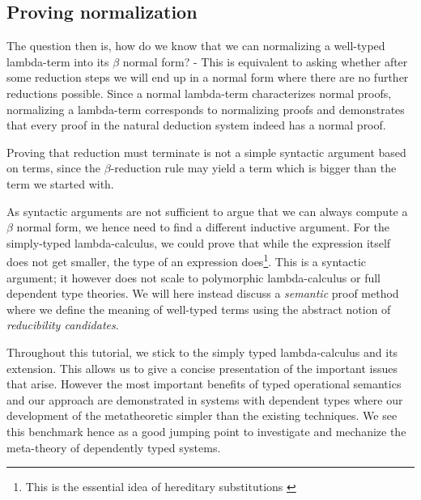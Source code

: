 \documentclass{article}
\begin{document}




\subsection*{Proving normalization}
The question then is, how do we know that we can normalizing a well-typed lambda-term into its $\beta$ normal form? - This is equivalent to asking whether after some reduction steps we will end up in a normal form where there are no further reductions possible. Since a normal lambda-term characterizes normal proofs, normalizing a lambda-term corresponds to normalizing proofs and demonstrates that every proof in the natural deduction system indeed has a normal proof. %

Proving that reduction must terminate is not a simple syntactic argument based on terms, since the $\beta$-reduction rule may yield a term which is bigger than the term we started with. %

As syntactic arguments are not sufficient to argue that we can always compute a $\beta$ normal form, we hence need to find a different inductive argument. For the simply-typed lambda-calculus, we could prove that while the expression itself does not get smaller,  the type of an expression does\footnote{This is the essential idea of hereditary substitutions \cite{Watkins02tr}}.  This is a syntactic argument; it however does not scale to polymorphic lambda-calculus or full dependent type theories. We will here instead discuss a \emph{semantic} proof method where we define the meaning of well-typed terms using the abstract notion of \emph{reducibility candidates}.

Throughout this tutorial, we stick to the simply typed lambda-calculus and its extension. This allows us to give a concise presentation of the important issues that arise.  However the most important benefits of typed operational semantics and our approach are demonstrated in systems with dependent types  where our development of the metatheoretic simpler than the existing techniques. We see this benchmark hence as a good jumping point to investigate and mechanize the meta-theory of dependently typed systems.


\end{document}
